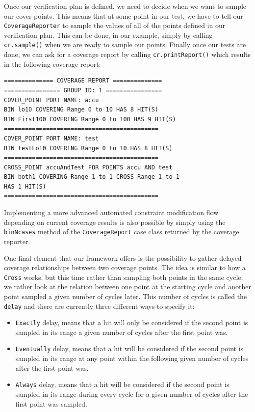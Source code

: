 \documentclass[runningheads]{llncs}
\begin{document}
Once our verification plan is defined, we need to decide when we want to sample our cover points. This means that at some point in our test, we have to tell our \texttt{CoverageReporter} to sample the values of all of the points defined in our verification plan. This can be done, in our example, simply by calling \texttt{cr.sample()} when we are ready to sample our points. Finally once our tests are done, we can ask for a coverage report by calling \texttt{cr.printReport()} which results in the following coverage report: 
\begin{verbatim}
============== COVERAGE REPORT ==============
================ GROUP ID: 1 ================
COVER_POINT PORT NAME: accu
BIN lo10 COVERING Range 0 to 10 HAS 8 HIT(S)
BIN First100 COVERING Range 0 to 100 HAS 9 HIT(S)
============================================
COVER_POINT PORT NAME: test
BIN testLo10 COVERING Range 0 to 10 HAS 8 HIT(S)
============================================
CROSS_POINT accuAndTest FOR POINTS accu AND test
BIN both1 COVERING Range 1 to 1 CROSS Range 1 to 1 
HAS 1 HIT(S)
============================================
\end{verbatim}
Implementing a more advanced automated constraint modification flow depending on current coverage results is also possible by simply using the \texttt{binNcases} method of the \texttt{CoverageReport} case class returned by the coverage reporter. 

One final element that our framework offers is the possibility to gather delayed coverage relationships between two coverage points. The idea is similar to how a \texttt{Cross} works, but this time rather than sampling both points in the same cycle, we rather look at the relation between one point at the starting cycle and another point sampled a given number of cycles later. This number of cycles is called the \texttt{delay} and there are currently three different ways to specify it:  
\begin{itemize}
  \item \texttt{Exactly} delay, means that a hit will only be considered if the second point is sampled in its range a given number of cycles after the first point was.
  \item \texttt{Eventually} delay, means that a hit will be considered if the second point is sampled in its range at any point within the following given number of cycles after the first point was.  
  \item \texttt{Always} delay, means that a hit will be considered if the second point is sampled in its range during every cycle for a given number of cycles after the first point was sampled.
\end{itemize}
\end{document}
